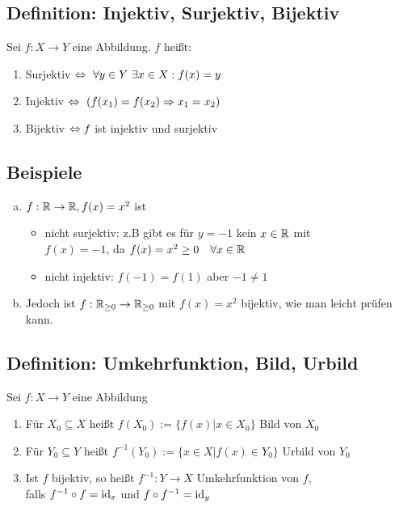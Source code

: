 \documentclass[10pt, a4paper, fleqn]{article}
\begin{document}
    \subsection{Definition: Injektiv, Surjektiv, Bijektiv}
    Sei $f: X \to Y$ eine Abbildung. $f$ heißt:
    \begin{enumerate}
        \item Surjektiv $\eqv \ \forall y \in Y \ \exists x \in X: f(x) = y$
        \item Injektiv $\Leftrightarrow \ (f(x_1) = f(x_2) \Rightarrow x_1 = x_2)$
        \item Bijektiv $\Leftrightarrow f$ ist injektiv und surjektiv 
    \end{enumerate}

    \subsection{Beispiele}
    \begin{enumerate}[a)]
        \item $f: \mathbb{R} \to \mathbb{R}, f(x) = x^2$ ist
        \begin{itemize}
            \item nicht surjektiv: z.B gibt es für $y=-1$ kein $x \in \mathbb{R}$ mit \\
            $f(x) = -1$, da $f(x) = x^2 \geq 0 \quad \forall x \in \mathbb{R}$
            \item nicht injektiv: $f(-1) = f(1)$ aber $-1 \neq 1$
        \end{itemize}
        \item Jedoch ist $f: \mathbb{R}_{\geq 0} \to \mathbb{R}_{\geq 0}$ mit $f(x) = x^2$ bijektiv,
        wie man leicht prüfen kann.
    \end{enumerate}

    \subsection{Definition: Umkehrfunktion, Bild, Urbild}
    Sei $f: X \to Y$ eine Abbildung
    \begin{enumerate}
        \item Für $X_0 \subseteq X$ heißt $f(X_0) := \{f(x) | x \in X_0\}$ Bild von $X_0$
        \item Für $Y_0 \subseteq Y$ heißt $f^{-1}(Y_0) := \{x \in X | f(x) \in Y_0\}$ Urbild von $Y_0$
        \item Ist $f$ bijektiv, so heißt $f^{-1}: Y \to X$ Umkehrfunktion von $f$, \\ 
        falls $f^{-1} \circ f = \text{id}_x$ und $f \circ f^{-1} = \text{id}_y$
    \end{enumerate}
\end{document}
